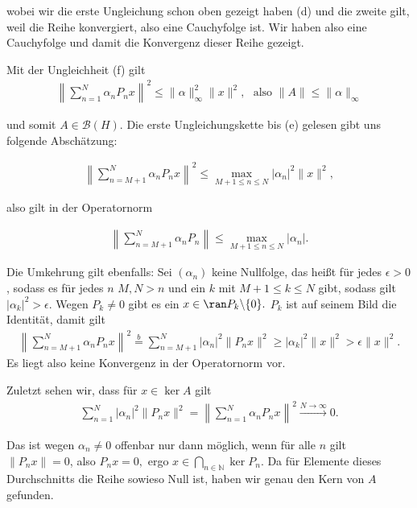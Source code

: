 \begin{solution}
wobei wir die erste Ungleichung schon oben gezeigt haben (d) und die zweite gilt, weil die Reihe konvergiert, also eine Cauchyfolge ist. Wir haben also eine Cauchyfolge und damit die Konvergenz dieser Reihe gezeigt.

Mit der Ungleichheit (f) gilt
\begin{align}
    \left\| \sum_{n = 1}^N \alpha_n P_n x \right\|^2 \leq \| \alpha \|_{\infty}^2 \| x \|^2, \text{~~also~} \|A\| \leq \|\alpha\|_{\infty}
\end{align}

und somit $A \in \mathcal{B}(H).$ Die erste Ungleichungskette bis (e) gelesen gibt uns folgende Abschätzung:

\begin{align}
\left\| \sum_{n = M+1}^N \alpha_n P_n x \right\|^2 \leq \max_{M+1 \leq n \leq N} |\alpha_n|^2 \|x\|^2,
\end{align}

also gilt in der Operatornorm

\begin{align}
\left\| \sum_{n = M+1}^N \alpha_n P_n \right\| \leq \max_{M+1 \leq n \leq N} |\alpha_n|.
\end{align}

Die Umkehrung gilt ebenfalls: Sei $(\alpha_n)$ keine Nullfolge, das heißt für jedes $\epsilon > 0$, sodass es für jedes $n$ $M, N > n$ und ein $k$ mit $M+1 \leq k \leq N$ gibt, sodass gilt $|\alpha_k|^2 > \epsilon.$ Wegen $P_k \neq 0$ gibt es ein $x \in \ran P_k\backslash\{0\}.$ $P_k$ ist auf seinem Bild die Identität, damit gilt
\begin{align}
 \left\| \sum_{n = M+1}^N \alpha_n P_n x \right\|^2 \stackrel{b}{=} \sum_{n = M+1}^N | \alpha_n|^2 \| P_n x \|^2 \geq |\alpha_k|^2 \|x\|^2 > \epsilon \|x\|^2.
\end{align}
Es liegt also keine Konvergenz in der Operatornorm vor.


Zuletzt sehen wir, dass für $x \in \ker A$ gilt
\begin{align*}
    \sum_{n=1}^N |\alpha_n|^2 \|P_n x\|^2 =
    \left\| \sum_{n = 1}^N \alpha_n P_n x \right\|^2 \stackrel{N \rightarrow \infty}{\longrightarrow} 0.
\end{align*}

Das ist wegen $\alpha_n \neq 0$ offenbar nur dann möglich, wenn für alle $n$ gilt $\|P_n x\| = 0$, also $P_n x = 0,$ ergo $x \in \bigcap_{n \in \mathbb{N}} \ker P_n$. Da für Elemente dieses Durchschnitts die Reihe sowieso Null ist, haben wir genau den Kern von $A$ gefunden.
\end{solution}
